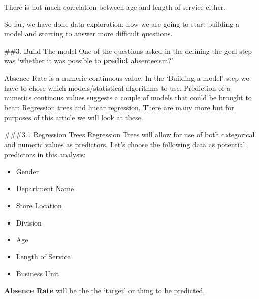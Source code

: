 \documentclass[12pt, krantz2,]{krantz}
\providecommand{\tightlist}{%
  \setlength{\itemsep}{0pt}\setlength{\parskip}{0pt}}
\begin{document}
There is not much correlation between age and length of service either.

So far, we have done data exploration, now we are going to start building a model and starting to answer more difficult questions.

\#\#3. Build The model
One of the questions asked in the defining the goal step was `whether it was possible to \textbf{predict} absenteeism?'

Absence Rate is a numeric continuous value. In the `Building a model' step we have to chose which models/statistical algorithms to use. Prediction of a numerics continous values suggests a couple of models that could be brought to bear: Regression trees and linear regression. There are many more but for purposes of this article we will look at these.

\#\#\#3.1 Regression Trees
Regression Trees will allow for use of both categorical and numeric values as predictors. Let's choose the following data as potential predictors in this analysis:

\begin{itemize}
\tightlist
\item
  Gender
\item
  Department Name
\item
  Store Location
\item
  Division
\item
  Age
\item
  Length of Service
\item
  Business Unit
\end{itemize}

\textbf{Absence Rate} will be the the `target' or thing to be predicted.
\end{document}
